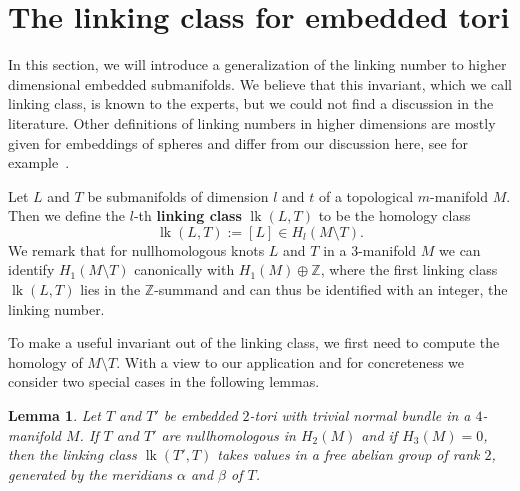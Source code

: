 \documentclass{amsart} %
\DeclareMathOperator{\lk}{lk}
\newcommand{\R}{\mathbb{R}}
\newcommand{\Z}{\mathbb{Z}}
\theoremstyle{thm}
\newtheorem{lem}[Theorem]{Lemma}
\theoremstyle{definition}
\begin{document}

\section{The linking class for embedded tori}
\label{section:linkingClass} 

In this section, we will introduce a generalization of the linking number to higher dimensional embedded submanifolds. We believe that this invariant, which we call linking class, is known to the experts, but we could not find a discussion in the literature. Other definitions of linking numbers in higher dimensions are mostly given for embeddings of spheres and differ from our discussion here, see for example~\cite{CKS04}.

Let $L$ and $T$ be submanifolds of dimension $l$ and $t$ of a topological $m$-manifold $M$. Then we define the $l$-th \textbf{linking class} $\lk(L,T)$ to be the homology class
$$\lk(L,T):=[L]\in H_l(M\setminus T).$$
We remark that for nullhomologous knots $L$ and $T$ in a $3$-manifold $M$ we can identify $H_1(M\setminus T)$ canonically with $H_1(M)\oplus \Z$, where the first linking class $\lk(L,T)$ lies in the $\Z$-summand and can thus be identified with an integer, the linking number.

%
%




To make a useful invariant out of the linking class, we first need to compute the homology of $M\setminus T$. With a view to our application and for concreteness we consider two special cases in the following lemmas. 


\begin{lem} \label{lem:hom}
Let $T$ and $T'$ be embedded $2$-tori with trivial normal bundle in a $4$-manifold $M$. If $T$ and $T'$ are nullhomologous in $H_2(M)$ and if $H_3(M)=0$, then 
the linking class $\lk(T',T)$ takes values in a free abelian group of rank $2$, generated by the meridians $\alpha$ and $\beta$ of $T$.
\end{lem}
\end{document}
